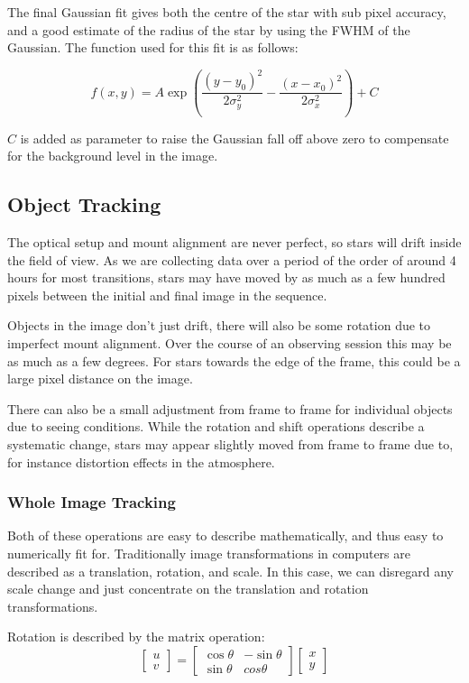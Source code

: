 The final Gaussian fit gives both the centre of the star with sub pixel accuracy, and a good estimate of the radius of the star by using the FWHM of the Gaussian. The function used for this fit is as follows:

\[ f(x,y) =A\exp{\left( \frac{(y-y_0)^2}{2\sigma_y^2} - \frac{(x-x_0)^2}{2\sigma_x^2} \right)} + C \]

$C$ is added as parameter to raise the Gaussian fall off above zero to compensate for the background level in the image.

\subsection{Object Tracking}

The optical setup and mount alignment are never perfect, so stars will drift inside the field of view. As we are collecting data over a period of the order of around 4 hours for most transitions, stars may have moved by as much as a few hundred pixels between the initial and final image in the sequence.

Objects in the image don't just drift, there will also be some rotation due to imperfect mount alignment. Over the course of an observing session this may be as much as a few degrees. For stars towards the edge of the frame, this could be a large pixel distance on the image.

There can also be a small adjustment from frame to frame for individual objects due to seeing conditions. While the rotation and shift operations describe a systematic change, stars may appear slightly moved from frame to frame due to, for instance distortion effects in the atmosphere.

\subsubsection{Whole Image Tracking}

Both of these operations are easy to describe mathematically, and thus easy to numerically fit for. Traditionally image transformations in computers are described as a translation, rotation, and scale. In this case, we can disregard any scale change and just concentrate on the translation and rotation transformations.

Rotation is described by the matrix operation:
\[
\begin{bmatrix}
    u \\ v
\end{bmatrix}
=
\begin{bmatrix}
\cos\theta & -\sin\theta \\
\sin\theta & cos\theta
\end{bmatrix}
\begin{bmatrix}
    x \\ y
\end{bmatrix}
\]

